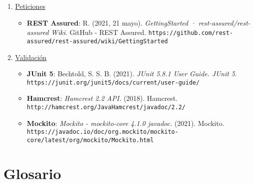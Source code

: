 \documentclass[../ei103948-project-documentation.tex]{subfiles}
\begin{document}
\begin{enumerate}
\begin{itemize}
                \end{itemize}
            \item \underline{Peticiones}
                \begin{itemize}
                    \item [\faIcon{book}] \textbf{REST Assured}: R. (2021, 21 mayo). \textit{GettingStarted · rest-assured/rest-assured Wiki}. GitHub - REST Assured. \texttt{https://github.com/rest-assured/rest-assured/wiki/GettingStarted}
                \end{itemize}
            \item \underline{Validación}
            \begin{itemize}
                    \item [\faIcon{book}] \textbf{JUnit 5}: Bechtold, S. S. B. (2021).\textit{ JUnit 5.8.1 User Guide. JUnit 5}. \texttt{https://junit.org/junit5/docs/current/user-guide/}
                    \item [\faIcon{book}] \textbf{Hamcrest}: \textit{Hamcrest 2.2 API.} (2018). Hamcrest. \texttt{http://hamcrest.org/JavaHamcrest/javadoc/2.2/}
                    \item [\faIcon{book}] \textbf{Mockito}: \textit{Mockito - mockito-core 4.1.0 javadoc.} (2021). Mockito. \texttt{https://javadoc.io/doc/org.mockito/mockito-core/latest/org/mockito/Mockito.html}
                \end{itemize}
        \end{enumerate}



\newpage
\section{Glosario}
\end{document}
